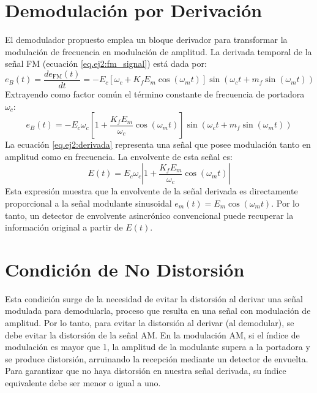 \section{Demodulación por Derivación}
El demodulador propuesto emplea un bloque derivador para transformar la modulación de frecuencia en modulación de
amplitud. La derivada temporal de la señal FM (ecuación \ref{eq.ej2:fm_signal}) está dada por:
\begin{equation*}
    e_B(t) = \frac{d e_{\text{FM}}(t)}{dt} = - E_c \left[\omega_c + K_f E_m \cos(\omega_m t)\right]
    \sin\left(\omega_c t + m_f \sin(\omega_m t)\right)
\end{equation*}
Extrayendo como factor común el término constante de frecuencia de portadora $\omega_c$:
\begin{equation}
    e_B(t) = - E_c \omega_c \left[1 + \frac{K_f E_m}{\omega_c} \cos(\omega_m t)\right]
    \sin\left(\omega_c t + m_f \sin(\omega_m t)\right)
    \label{eq.ej2:derivada}
\end{equation}
La ecuación \ref{eq.ej2:derivada} representa una señal que posee modulación tanto en amplitud como en frecuencia.
La envolvente de esta señal es:
\begin{equation}
    E(t) = E_c \omega_c \left| 1 + \frac{K_f E_m}{\omega_c} \cos(\omega_m t) \right|
    \label{eq.ej2:envolvente}
\end{equation}
Esta expresión muestra que la envolvente de la señal derivada es directamente proporcional a la señal modulante
sinusoidal $e_m(t) = E_m \cos(\omega_m t)$. Por lo tanto, un detector de envolvente asincrónico convencional puede
recuperar la información original a partir de $E(t)$.

\section{Condición de No Distorsión}
Esta condición surge de la necesidad de evitar la distorsión al derivar una señal modulada para demodularla, proceso que resulta en una señal con modulación de amplitud. Por lo tanto, para evitar la distorsión al derivar (al demodular), se debe evitar la distorsión de la señal AM. En la modulación AM, si el índice de modulación es mayor que 1, la amplitud de la modulante supera a la portadora y se produce distorsión, arruinando la recepción mediante un detector de envuelta. Para garantizar que no haya distorsión en nuestra señal derivada, su índice equivalente debe ser menor o igual a uno.

